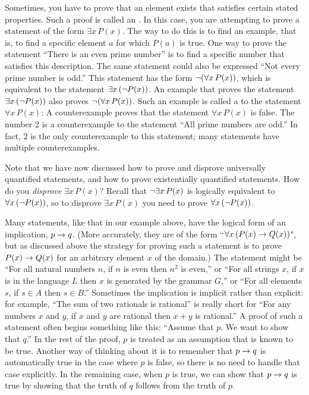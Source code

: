 Sometimes, you have to prove that an element exists that satisfies
certain stated properties.  Such a proof is called an
.  In this case, you are attempting to
prove a statement of the form $\exists x\,P(x)$.  The way to
do this is to find an example, that is, to find a specific
element $a$ for which $P(a)$ is true.  One way to prove
the statement ``There is an even prime number'' is to find
a specific number that satisfies this description.  
The same statement could also
be expressed ``Not every prime number is odd.''  This statement
has the form $\lnot(\forall x\,P(x))$, which is equivalent
to the statement $\exists x\,(\lnot P(x))$.  
An example that proves the statement $\exists x\,(\lnot P(x))$
also proves $\lnot(\forall x\,P(x))$.  Such an example is
called a  to the statement $\forall x\,P(x)$:
A counterexample proves that the statement $\forall x\,P(x)$ is false.
The number 2 is a counterexample to the statement ``All prime numbers
are odd.''  In fact, 2 is the only counterexample to this
statement; many statements have multiple counterexamples.

Note that we have now discussed how to prove and disprove
universally quantified statements, and how to prove existentially
quantified statements.  How do you {\em disprove} $\exists x\,P(x)$?
Recall that $\lnot \exists x\,P(x)$ is logically equivalent to
$\forall x\,(\lnot P(x))$, so to disprove $\exists x\,P(x)$ you need
to prove $\forall x\,(\lnot P(x))$.

Many statements, like that in our example above, 
have the logical form of an implication, $p\rightarrow q$.
(More accurately, they
are of the form ``$\forall x\, (P(x) \rightarrow Q(x))$", but as discussed above
the
strategy for proving such a statement is to prove $P(x) \rightarrow Q(x)$ 
for an arbitrary element $x$ of the
domain.)  The statement
might be ``For all natural numbers $n$, if $n$ is even then $n^2$ is even,'' or ``For
all strings $x$, if $x$ is in the language $L$ then $x$ is generated by the grammar $G$,''
or ``For all elements $s$, if $s \in A$ then $s \in B$.''  Sometimes the implication is
implicit rather than explicit: for example, ``The sum of two rationals is rational'' is
really short for ``For any numbers $x$ and $y$, if $x$ and $y$ are rational then $x+y$
is rational.''
A proof of such a statement often begins something like this:
``Assume that $p$.  We want to show that $q$.''  In the rest of
the proof, $p$ is treated as an assumption that is known to be
true.  %
Another way of thinking about it is to remember
that $p\rightarrow q$ is
automatically true in the case where $p$ is false, so there is no
need to handle that case explicitly.  In the remaining case, when $p$ is
true, we can show that $p\rightarrow q$ is true by showing that the truth of $q$
follows from the truth of $p$.

